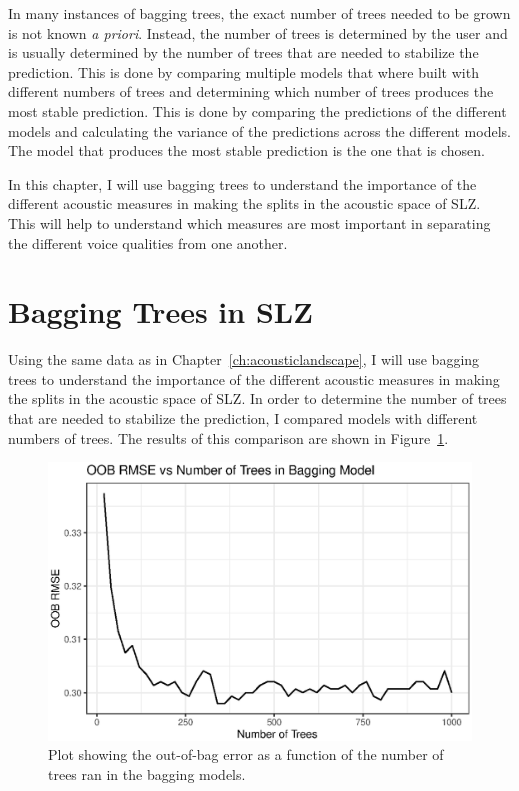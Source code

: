 In many instances of bagging trees, the exact number of trees needed to be grown is not known \textit{a priori}. Instead, the number of trees is determined by the user and is usually determined by the number of trees that are needed to stabilize the prediction. This is done by comparing multiple models that where built with different numbers of trees and determining which number of trees produces the most stable prediction. This is done by comparing the predictions of the different models and calculating the variance of the predictions across the different models. The model that produces the most stable prediction is the one that is chosen.

In this chapter, I will use bagging trees to understand the importance of the different acoustic measures in making the splits in the acoustic space of SLZ. This will help to understand which measures are most important in separating the different voice qualities from one another.

\section{Bagging Trees in SLZ} \label{sec:bagging_slz}

Using the same data as in Chapter~\ref{ch:acousticlandscape}, I will use bagging trees to understand the importance of the different acoustic measures in making the splits in the acoustic space of SLZ. In order to determine the number of trees that are needed to stabilize the prediction, I compared models with different numbers of trees. The results of this comparison are shown in Figure~\ref{fig:bagging_tree}.

\begin{figure}[!ht]
    \centering
    \includegraphics[width = 0.9\linewidth]{images/bagging_numbers.eps}
    \caption{Plot showing the out-of-bag error as a function of the number of trees ran in the bagging models.}
    \label{fig:bagging_tree}
\end{figure}

